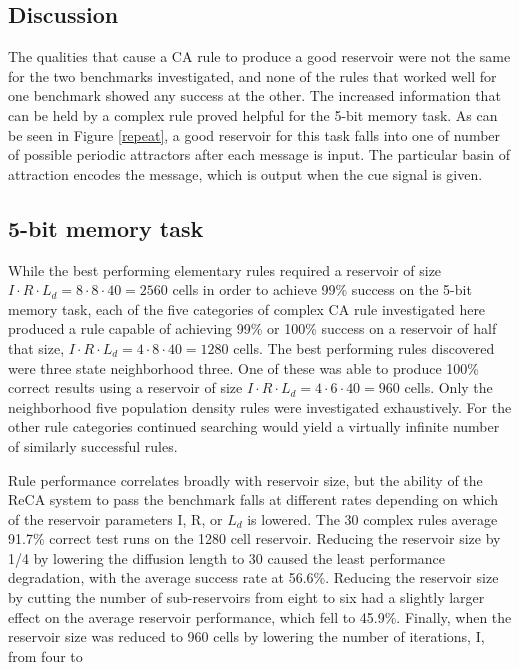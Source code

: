 \documentclass{elsarticle}
\begin{document}
\begin{multicols}{2}
\section{Discussion}\label{discussion}
The qualities that cause a CA rule to produce a good reservoir were not the 
   same for the two benchmarks investigated, and none of the rules that worked 
   well for one benchmark showed any success at the other. The increased 
   information that can be held by a complex rule proved helpful for the 5-bit 
   memory task. As can be seen in Figure \ref{repeat}, a good reservoir for 
   this task falls into one of number of possible  periodic attractors after 
   each message is input. The particular basin of attraction encodes the 
   message, which is output when the cue signal is given. 
   
   \subsection{5-bit memory task}
While the best performing elementary rules required a reservoir of size $I \cdot R 
\cdot L_{d} = 8 \cdot 8 \cdot 40 = 2560$ cells in order to achieve 99\% success on the 
5-bit memory task, each of the five categories of complex CA rule investigated 
here produced a rule capable of achieving 99\% or 100\% success on a reservoir 
of half that size, $I \cdot R \cdot L_{d} = 4 \cdot 8 \cdot 40 = 1280$ cells. The best 
performing rules discovered were three state neighborhood three. One of these 
was able to produce 100\% correct results using a reservoir of size $I \cdot R \cdot 
L_{d} = 4 \cdot 6 \cdot 40 = 960$ cells. Only the neighborhood five population density 
rules were investigated exhaustively.  For the other rule categories continued 
searching would yield a virtually infinite number of similarly successful 
rules. \par Rule performance correlates broadly with reservoir size, but the 
ability of the ReCA system to  pass the benchmark falls at different rates 
depending on which of the reservoir parameters I, R, or $L_{d}$ is lowered. The 
30 complex rules average 91.7\% correct test runs on the 1280 cell reservoir.  
Reducing the reservoir size by 1/4 by lowering the diffusion length to 30 
caused the least performance degradation, with the average success rate at 
56.6\%. Reducing the reservoir size by cutting the number of sub-reservoirs 
from eight to six had a slightly larger effect on the average reservoir 
performance, which fell to 45.9\%.  Finally, when the reservoir size was 
reduced to 960 cells by lowering the number of iterations, I, from four to 

\end{multicols}
\end{document}
